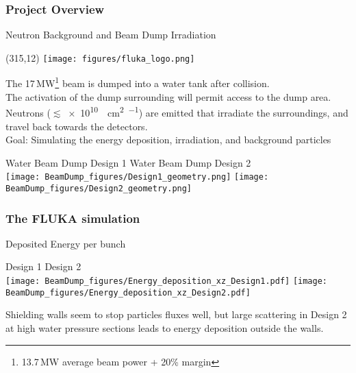\documentclass[xcolor={dvipsnames}]{beamer}
\newcommand{\flukalogo}{
  \setlength{\TPHorizModule}{1pt}
  \setlength{\TPVertModule}{1pt}
  \begin{textblock}{1}(315,12)
   \texttt{[image: figures/fluka\_logo.png]}
  \end{textblock}
}
\begin{document}
\subsubsection{Project Overview}
{
\begin{frame}{Neutron Background and Beam Dump Irradiation}
\flukalogo
The \alert{17\,MW}\footnote{13.7\,MW average beam power + 20\% margin} \alert{beam is dumped into a water tank} after collision.\\The activation of the dump surrounding will permit access to the dump area. Neutrons ($\lesssim$\SI{e10}{\per\square\centi\metre\per\year}) are emitted that irradiate the surroundings, and travel back towards the detectors.~\cite{SLAC_FLUKA}\\
\vspace*{0.1cm}
\alert{Goal: Simulating the energy deposition, irradiation, and background particles}
\begin{center}
  \hspace*{0.5cm} Water Beam Dump Design 1 \hfill Water Beam Dump Design 2 \hspace*{0.5cm} \\
  \texttt{[image: BeamDump\_figures/Design1\_geometry.png]}
  \hspace*{0.1cm}
  \texttt{[image: BeamDump\_figures/Design2\_geometry.png]}
\end{center}
\end{frame}
}

\subsubsection{The FLUKA simulation}
\begin{frame}{Deposited Energy per bunch}
\begin{center}
\hspace*{1.6cm} Design 1 \hfill Design 2 \hspace*{1.8cm} \\
  \texttt{[image: BeamDump\_figures/Energy\_deposition\_xz\_Design1.pdf]}
    \texttt{[image: BeamDump\_figures/Energy\_deposition\_xz\_Design2.pdf]}
\end{center}
 Shielding walls seem to stop particles fluxes well, but large scattering in Design 2 at high water pressure sections leads to energy deposition outside the walls.
\end{frame}
\end{document}
